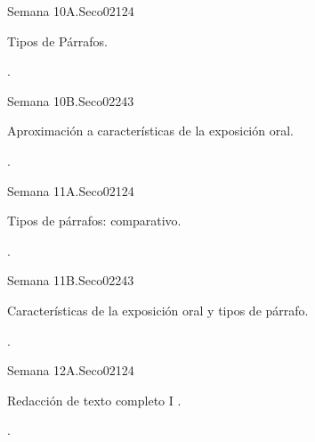 \begin{syllabus}
\begin{unit}{}{Semana 10A.}{Seco02}{12}{4}
   \begin{topics}
      \item Tipos de Párrafos.
   \end{topics}
   \begin{learningoutcomes}
      \item .
   \end{learningoutcomes}
\end{unit}

\begin{unit}{}{Semana 10B.}{Seco02}{24}{3}
   \begin{topics}
      \item Aproximación a características de la exposición oral.
   \end{topics}

   \begin{learningoutcomes}
      \item .
      \end{learningoutcomes}
\end{unit}

\begin{unit}{}{Semana 11A.}{Seco02}{12}{4}
   \begin{topics}
      \item Tipos de párrafos: comparativo.
   \end{topics}
   \begin{learningoutcomes}
      \item .
   \end{learningoutcomes}
\end{unit}

\begin{unit}{}{Semana 11B.}{Seco02}{24}{3}
   \begin{topics}
      \item Características de la exposición oral y tipos de párrafo.
   \end{topics}

   \begin{learningoutcomes}
      \item .
      \end{learningoutcomes}
\end{unit}

\begin{unit}{}{Semana 12A.}{Seco02}{12}{4}
   \begin{topics}
      \item Redacción de texto completo I .
   \end{topics}
   \begin{learningoutcomes}
      \item .
   \end{learningoutcomes}
\end{unit}


\end{syllabus}
